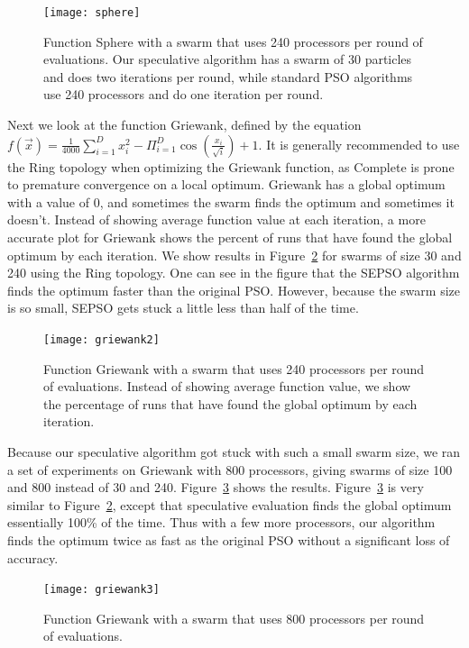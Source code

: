 \documentclass[journal,letterpaper]{IEEEtran}
\newcommand{\fig}[1]{Figure~\ref{fig:#1}}
\begin{document}
\begin{figure}
  \centering
  \texttt{[image: sphere]}
  \caption{Function Sphere with a swarm that uses 240 processors per round of
  evaluations.  Our speculative algorithm has a swarm of 30 particles and does
  two iterations per round, while standard PSO algorithms use 240 processors
  and do one iteration per round.}
  \label{fig:basic-sphere}
\end{figure}

Next we look at the function Griewank, defined by the equation $f(\Vec{x}) =
\frac{1}{4000} \sum_{i=1}^D x_i^2 - \Pi_{i=1}^D \cos\left(\frac{x_i}{\sqrt{i}}
\right) + 1$.  It is generally recommended to use the Ring topology when
optimizing the Griewank function, as Complete is prone to premature convergence
on a local optimum.  Griewank has a global optimum with a value of 0, and
sometimes the swarm finds the optimum and sometimes it doesn't.  Instead of
showing average function value at each iteration, a more accurate plot for
Griewank shows the percent of runs that have found the global optimum by each
iteration.  We show results in \fig{basic-griewank2} for swarms of size 30 and
240 using the Ring topology.  One can see in the figure that the SEPSO
algorithm finds the optimum faster than the original PSO.  However, because the
swarm size is so small, SEPSO gets stuck a little less than half of the time.

\begin{figure}
  \centering
  \texttt{[image: griewank2]}
  \caption{Function Griewank with a swarm that uses 240 processors per round of
  evaluations.  Instead of showing average function value, we show the
  percentage of runs that have found the global optimum by each iteration.}
  \label{fig:basic-griewank2}
\end{figure}

Because our speculative algorithm got stuck with such a small swarm size, we
ran a set of experiments on Griewank with 800 processors, giving swarms of size
100 and 800 instead of 30 and 240.  \fig{basic-griewank3} shows the results.
\fig{basic-griewank3} is very similar to \fig{basic-griewank2}, except that
speculative evaluation finds the global optimum essentially 100\% of the time.
Thus with a few more processors, our algorithm finds the optimum twice as fast
as the original PSO without a significant loss of accuracy.

\begin{figure}
  \centering
  \texttt{[image: griewank3]}
  \caption{Function Griewank with a swarm that uses 800 processors per round of
  evaluations.}
  \label{fig:basic-griewank3}
\end{figure}
\end{document}
